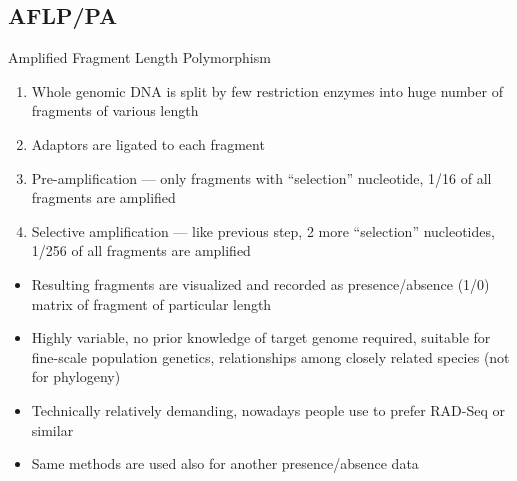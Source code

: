 \documentclass[compress, xelatex, 11pt, xcolor=svgnames, aspectratio=169, url={hyphens, lowtilde}]{beamer}
\begin{document}
\subsection{AFLP/PA}

\begin{frame}{Amplified Fragment Length Polymorphism}
	\begin{enumerate}
		\item Whole genomic DNA is split by few restriction enzymes into huge number of fragments of various length
		\item Adaptors are ligated to each fragment
		\item Pre-amplification --- only fragments with \enquote{selection} nucleotide, 1/16 of all fragments are amplified
		\item Selective amplification --- like previous step, 2 more \enquote{selection} nucleotides, 1/256 of all fragments are amplified
	\end{enumerate}
	\begin{itemize}
		\item Resulting fragments are visualized and recorded as presence/absence (1/0) matrix of fragment of particular length
		\item Highly variable, no prior knowledge of target genome required, suitable for fine-scale population genetics, relationships among closely related species (not for phylogeny)
		\item Technically relatively demanding, nowadays people use to prefer RAD-Seq or similar
		\item \alert{Same methods are used also for another presence/absence data}
	\end{itemize}
\end{frame}
\end{document}
